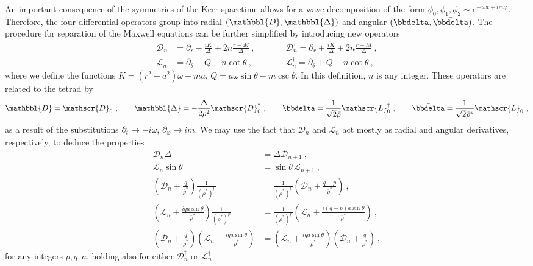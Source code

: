 An important consequence of the symmetries of the Kerr spacetime allows for a wave decomposition of the form $\phi_0, \phi_1, \phi_2 \sim e^{- i \omega t + i m \varphi}$.
Therefore, the four differential operators group into radial $(\mathbbl{D}, \mathbbl{\Delta})$ and angular $(\bbdelta, \bar{\bbdelta})$. The procedure for separation of the Maxwell equations can be further simplified by introducing new operators
\begin{equation}
    \begin{alignedat}{3}
        \mathscr{D}_n &= \partial_r - \frac{i K}{\Delta} + 2n \frac{r-M}{\Delta} ~,\qquad && \mathscr{D}_n^\dagger = \partial_r + \frac{i K}{\Delta} + 2n \frac{r-M}{\Delta} ~,\\
        \mathscr{L}_n &= \partial_\theta - Q + n \cot\theta ~,\qquad && \mathscr{L}_n^\dagger = \partial_\theta + Q + n \cot\theta ~,
    \end{alignedat}
\end{equation}
where we define the functions $K=(r^2+a^2)\omega - m a$, $Q = a \omega \sin\theta - m \csc\theta$.
In this definition, $n$ is any integer.
These operators are related to the tetrad by
\begin{align}
    \label{eq3:ChadrasekharOperators}
    \mathbbl{D} = \mathscr{D}_0 ~,\qquad \mathbbl{\Delta} = - \frac{\Delta}{2 \rho^2 }\mathscr{D}^\dagger_0 ~,\qquad \bbdelta = \frac{1}{\sqrt{2} \bar{\rho}} \mathscr{L}^\dagger_0 ~,\qquad \bar\bbdelta = \frac{1}{\sqrt{2} \bar{\rho}^*} \mathscr{L}_0 ~,
\end{align}
as a result of the substitutions $\partial_t\rightarrow-i \omega$, $\partial_\varphi\rightarrow i m$.
We may use the fact that $\mathscr{D}_n$ and $\mathscr{L}_n$ act mostly as radial and angular derivatives, respectively, to deduce the properties
\begin{subequations}
    \begin{align}
        \label{eq3:propDeltaD}
        \mathscr{D}_n \Delta &= \Delta \mathscr{D}_{n+1} ~, \\[0.15cm]
        \label{eq3:propSinL}
        \mathscr{L}_n \sin\theta &= \sin\theta\, \mathscr{L}_{n+1} ~, \\[0.15cm]
        \label{eq3:propBarRhoD}
        \left(\mathscr{D}_n + \frac{q}{\bar{\rho}^*} \right) \frac{1}{(\bar{\rho}^*)^p} &= 
        \frac{1}{(\bar{\rho}^*)^p} \left(\mathscr{D}_n + \frac{q-p}{\bar{\rho}^*} \right) ~, \\[0.15cm]
        \label{eq3:propBarRhoL}
        \left(\mathscr{L}_n + \frac{i q a \sin\theta}{\bar{\rho}^*} \right) \frac{1}{(\bar{\rho}^*)^p} &= 
        \frac{1}{(\bar{\rho}^*)^p} \left(\mathscr{L}_n + \frac{i (q-p) a \sin\theta}{\bar{\rho}^*} \right) ~, \\[0.15cm]
        \label{eq3:propCommutLD}
        \left(\mathscr{D}_n + \frac{q}{\bar{\rho}^*} \right) 
        \left(\mathscr{L}_n + \frac{i q a \sin\theta}{\bar{\rho}^*} \right) &= 
        \left(\mathscr{L}_n + \frac{i q a \sin\theta}{\bar{\rho}^*} \right)
        \left(\mathscr{D}_n + \frac{q}{\bar{\rho}^*} \right) ~,
    \end{align}
\end{subequations}
for any integers $p,q,n$, holding also for either $\mathscr{D}^\dagger_n$ or $\mathscr{L}^\dagger_n$.

